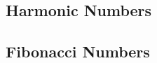 \tasktodo

\tasktodo

\tasktodo

\tasktodo

\tasktodo

\tasktodo

\subsection{Harmonic Numbers}

\tasktodo

\tasktodo

\tasktodo

\tasktodo

\tasktodo

\tasktodo

\tasktodo

\tasktodo

\tasktodo

\tasktodo

\tasktodo

\tasktodo

\tasktodo

\tasktodo

\tasktodo

\tasktodo

\tasktodo

\tasktodo

\tasktodo

\tasktodo

\tasktodo

\tasktodo

\tasktodo

\tasktodo

\tasktodo

\subsection{Fibonacci Numbers}

\tasktodo

